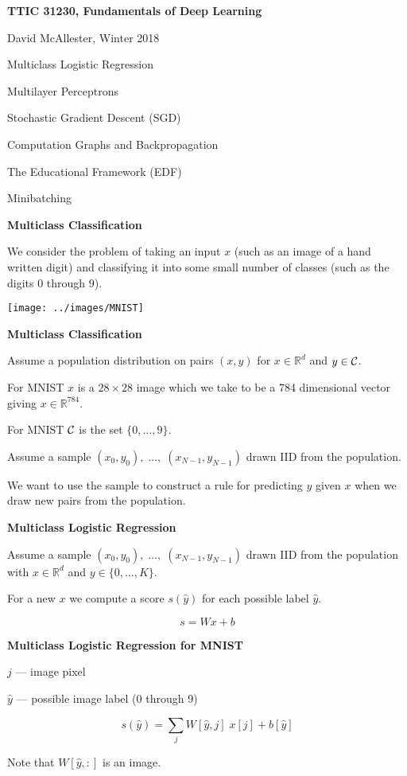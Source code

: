 \documentclass[landscape]{article}
\newcommand{\slide}[1]{
  \vfill
  \centerline{\Large\thepage}
  \eject
  \centerline{\bf #1}
  \vfill}
\newcommand{\reals}{\mathbb{R}}
\begin{document}
{\Huge
  
  \centerline{\bf TTIC 31230, Fundamentals of Deep Learning}
  \bigskip
  \centerline{David McAllester, Winter 2018}
  \vfill
  \vfill
  \centerline{Multiclass Logistic Regression}
  \vfill
  \centerline{Multilayer Perceptrons}
  \vfill
  \centerline{Stochastic Gradient Descent (SGD)}
  \vfill
  \centerline{Computation Graphs and Backpropagation}
  \vfill
  \centerline{The Educational Framework (EDF)}
  \vfill
  \centerline{Minibatching}
  \vfill
  \vfill
  \vfill

\slide{Multiclass Classification}

We consider the problem of taking an input $x$ (such as an image of a hand written digit) and classifying it into some small number of classes (such as the digits $0$ through $9$).

\vfill
\centerline{\texttt{[image: ../images/MNIST]}}
  
\slide{Multiclass Classification}

Assume a population distribution on pairs $(x,y)$ for $x \in \reals^d$ and $y \in {\cal C}$.

\vfill
For MNIST $x$ is a $28 \times 28$ image which we take to be a 784 dimensional vector giving $x \in \reals^{784}$.

\vfill
For MNIST ${\cal C}$ is the set $\{0,\ldots,9\}$.

\vfill
Assume a sample $(x_0,y_0),\;\ldots,\;(x_{N-1},y_{N-1})$ drawn IID from the population.

\vfill
We want to use the sample to construct a rule for predicting $y$ given $x$ when we draw new pairs from the population.

\slide{Multiclass Logistic Regression}

Assume a sample $(x_0,y_0),\;\ldots,\;(x_{N-1},y_{N-1})$ drawn IID from the population with $x \in \reals^d$ and $y \in \{0,\ldots,K\}$.

\vfill
For a new $x$ we compute a score $s(\hat{y})$ for each possible label $\hat{y}$.

\vfill
$$s = Wx + b$$

\slide{Multiclass Logistic Regression for MNIST}

$j$ --- image pixel

\vfill
$\hat{y}$ --- possible image label (0 through 9)

\vfill
$$s(\hat{y}) = \sum_j W[\hat{y},j]\; x[j] + b[\hat{y}]$$

\vfill
Note that $W[\hat{y},:]$ is an image.

}
\end{document}
